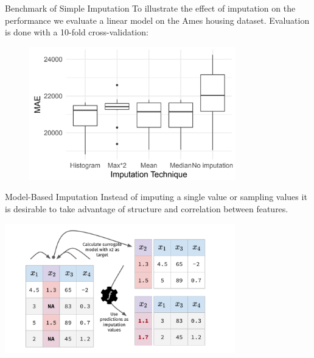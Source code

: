 \begin{vbframe}{Benchmark of Simple Imputation}
To illustrate the effect of imputation on the performance we evaluate a linear model on the Ames housing dataset.
Evaluation is done with a 10-fold cross-validation:
\vspace{+.2cm}

\begin{figure}
\includegraphics[width = 0.8\textwidth]{figure_man/simple-imputation.png}
\end{figure}

\end{vbframe}

\begin{vbframe}{Model-Based Imputation}
Instead of imputing a single value or sampling values it is desirable to take advantage of structure and correlation between features.
\begin{center}
\includegraphics[width = 10cm]{figure_man/fe_imputation_models.pdf}
\end{center}
\end{vbframe}

